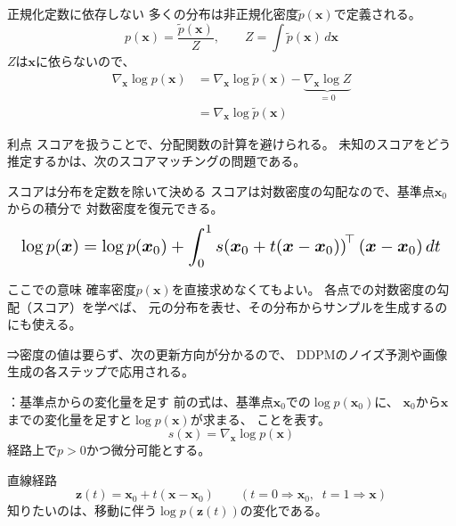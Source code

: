 \asmain
\begin{frame}{正規化定数に依存しない}
    多くの分布は非正規化密度$\tilde{p}(\bm{x})$で定義される。
    \[
        p(\bm{x})
        =
        \frac{\tilde{p}(\bm{x})}{Z},
        \qquad
        Z=\int\tilde{p}(\bm{x})\,d\bm{x}
\]
    $Z$は$\bm{x}$に依らないので、
    \[
        \begin{aligned}
        \nabla_{\bm{x}}\log p(\bm{x})
        &=
        \nabla_{\bm{x}}\log\tilde{p}(\bm{x})
        -
        \underbrace{\nabla_{\bm{x}}\log Z}_{=0}\\
        &=
        \nabla_{\bm{x}}\log\tilde{p}(\bm{x})
        \end{aligned}
        \tag{3.1.2}
    \]
    \begin{block}{利点}
        スコアを扱うことで、分配関数の計算を避けられる。
        未知のスコアをどう推定するかは、次のスコアマッチングの問題である。
    \end{block}
\end{frame}
\asmain
\begin{frame}{スコアは分布を定数を除いて決める}
    スコアは対数密度の勾配なので、基準点$\bm{x}_0$からの積分で
    対数密度を復元できる。
    \[
        \resizebox{0.98\textwidth}{!}{$
        \log p(\bm{x})
        =
        \log p(\bm{x}_0)
        +
        \displaystyle\int_0^1
        s\!\left(\bm{x}_0+t(\bm{x}-\bm{x}_0)\right)^{\!\top}
        (\bm{x}-\bm{x}_0)
        \,dt
        $}
\]
    \begin{block}{ここでの意味}
        確率密度$p(\bm{x})$を直接求めなくてもよい。
        各点での対数密度の勾配（スコア）を学べば、
        元の分布を表せ、その分布からサンプルを生成するのにも使える。
    \end{block}
    ⇒密度の値は要らず、次の更新方向が分かるので、
    DDPMのノイズ予測や画像生成の各ステップで応用される。
\end{frame}
\assuppl
\begin{frame}{\supplmark：基準点からの変化量を足す}
    前の式は、基準点$\bm{x}_0$での$\log p(\bm{x}_0)$に、
    $\bm{x}_0$から$\bm{x}$までの変化量を足すと$\log p(\bm{x})$が求まる、
    ことを表す。
    \[
        s(\bm{x})=\nabla_{\bm{x}}\log p(\bm{x})
    \]
    経路上で$p>0$かつ微分可能とする。
    \begin{exampleblock}{直線経路}
        \[
            \bm{z}(t)=\bm{x}_0+t(\bm{x}-\bm{x}_0)
            \qquad(t=0\Rightarrow\bm{x}_0,\;\; t=1\Rightarrow\bm{x})
        \]
        知りたいのは、移動に伴う$\log p(\bm{z}(t))$の変化である。
    \end{exampleblock}
\end{frame}

